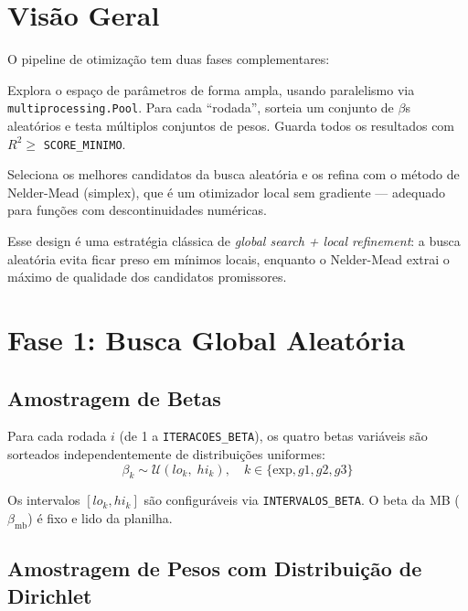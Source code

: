 \documentclass[12pt,a4paper]{report}
\newcommand{\code}[1]{\texttt{#1}}
\begin{document}
\section{Visão Geral}

O pipeline de otimização tem duas fases complementares:

\begin{description}[leftmargin=2.5em, style=nextline]
  \item[\textbf{Fase 1 — Busca global aleatória}]
    Explora o espaço de parâmetros de forma ampla, usando paralelismo
    via \code{multiprocessing.Pool}. Para cada ``rodada'', sorteia um
    conjunto de $\beta$s aleatórios e testa múltiplos conjuntos de pesos.
    Guarda todos os resultados com $R^2 \geq$ \code{SCORE\_MINIMO}.

  \item[\textbf{Fase 2 — Refinamento local com Nelder-Mead}]
    Seleciona os melhores candidatos da busca aleatória e os refina com
    o método de Nelder-Mead (simplex), que é um otimizador local sem
    gradiente — adequado para funções com descontinuidades numéricas.
\end{description}

Esse design é uma estratégia clássica de \textit{global search + local
refinement}: a busca aleatória evita ficar preso em mínimos locais,
enquanto o Nelder-Mead extrai o máximo de qualidade dos candidatos
promissores.

\section{Fase 1: Busca Global Aleatória}

\subsection{Amostragem de Betas}

Para cada rodada $i$ (de 1 a \code{ITERACOES\_BETA}), os quatro betas
variáveis são sorteados independentemente de distribuições uniformes:
\[
  \beta_k \sim \mathcal{U}(lo_k,\; hi_k), \quad k \in \{\text{exp}, g1, g2, g3\}
\]

Os intervalos $[lo_k, hi_k]$ são configuráveis via \code{INTERVALOS\_BETA}.
O beta da MB ($\beta_{\text{mb}}$) é fixo e lido da planilha.

\subsection{Amostragem de Pesos com Distribuição de Dirichlet}
\end{document}
